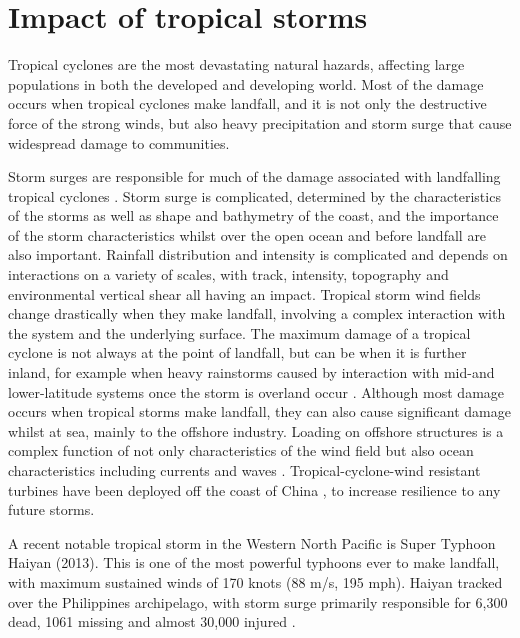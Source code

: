 


\section{Impact of tropical storms}

Tropical cyclones are the most devastating natural hazards, affecting large populations in both the developed and developing world. Most of the damage occurs when tropical cyclones make landfall, and it is not only the destructive force of the strong winds, but also heavy precipitation and storm surge that cause widespread damage to communities.

Storm surges are responsible for much of the damage associated with landfalling tropical cyclones \citep{lin2012physically}. Storm surge is complicated, determined by the characteristics of the storms as well as shape and bathymetry of the coast, and the importance of the storm characteristics whilst over the open ocean and before landfall are also important. Rainfall distribution and intensity is complicated and depends on interactions on a variety of scales, with track, intensity, topography and environmental vertical shear all having an impact. Tropical storm wind fields change drastically when they make landfall, involving a complex interaction with the system and the underlying surface. The maximum damage of a tropical cyclone is not always at the point of landfall, but can be when it is further inland, for example when heavy rainstorms caused by interaction with mid-and lower-latitude systems once the storm is overland occur \citep{xiao2013analysis}. Although most damage occurs when tropical storms make landfall, they can also cause significant damage whilst at sea, mainly to the offshore industry. Loading on offshore structures is a complex function of not only characteristics of the wind field but also ocean characteristics including currents and waves \citep{done2014future}. Tropical-cyclone-wind resistant turbines have been deployed off the coast of China \citep{clark2014global}, to increase resilience to any future storms.

A recent notable tropical storm in the Western North Pacific is Super Typhoon Haiyan (2013). This is one of the most powerful typhoons ever to make landfall, with maximum sustained winds of 170 knots (88 m/s, 195 mph). Haiyan tracked over the Philippines archipelago, with storm surge primarily responsible for 6,300 dead, 1061 missing and almost 30,000 injured \citep{lagmay2015devastating}. %

